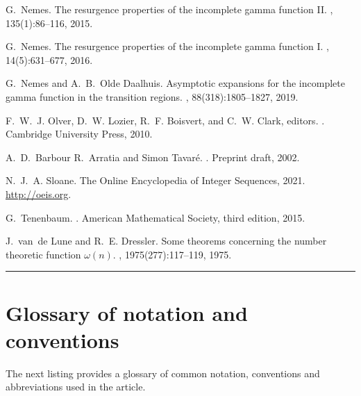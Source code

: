 \documentclass[11pt,reqno,a4letter]{article}
\numberwithin{equation}{section}
\numberwithin{figure}{section}
\numberwithin{table}{section}
\theoremstyle{plain}
\numberwithin{theorem}{section}
\theoremstyle{definition}
\begin{document}
\begin{thebibliography}{10}
G.~Nemes.
\newblock The resurgence properties of the incomplete gamma function {II}.
, 135(1):86--116, 2015.

G.~Nemes.
\newblock The resurgence properties of the incomplete gamma function {I}.
, 14(5):631--677, 2016.

G.~Nemes and A.~B.~Olde Daalhuis.
\newblock Asymptotic expansions for the incomplete gamma function in the
  transition regions.
, 88(318):1805--1827, 2019.

F.~W.~J. Olver, D.~W. Lozier, R.~F. Boisvert, and C.~W. Clark, editors.
.
\newblock Cambridge University Press, 2010.

A.~D.~Barbour R.~Arratia and Simon Tavar{\'{e}}.
.
\newblock Preprint draft, 2002.

N.~J.~A. Sloane.
\newblock The {O}nline {E}ncyclopedia of {I}nteger {S}equences, 2021.
\newblock \url{http://oeis.org}.

G.~Tenenbaum.
.
\newblock American Mathematical Society, third edition, 2015.

J.~van~de Lune and R.~E. Dressler.
\newblock Some theorems concerning the number theoretic function $\omega(n)$.
, 1975(277):117--119, 1975.

\end{thebibliography}

\bigskip\hrule\smallskip 

\appendix
{}
\setcounter{section}{0} 
\renewcommand{\thesection}{\Alph{section}} 

\section{Glossary of notation and conventions}
\label{Section_NotationAndConventions}

The next listing provides a 
glossary of common notation, conventions and 
abbreviations used in the article. 

\renewcommand*{\glsclearpage}{}
\renewcommand{\glossarysection}[2][]{}
\printglossary[type={symbols},
               style={glossstyleSymbol},
               nogroupskip=true]
\end{document}
